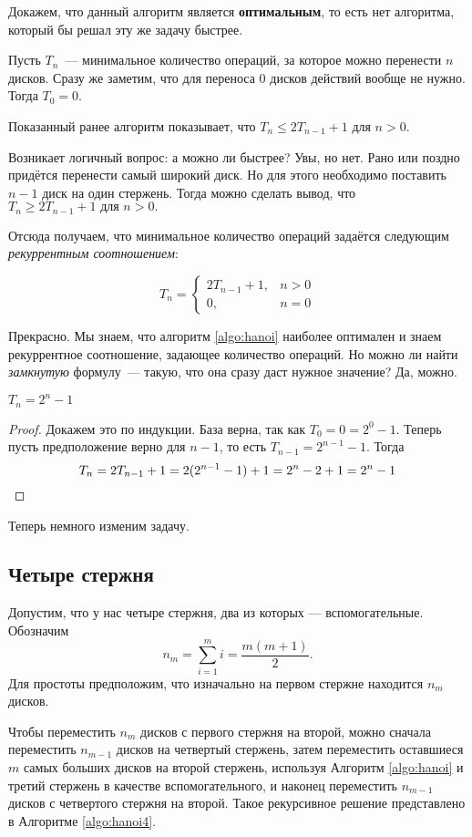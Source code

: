 \documentclass[a4paper,12pt]{article}
\begin{document}
Докажем, что данный алгоритм является \textbf{оптимальным}, то есть нет 
алгоритма, который бы решал эту же задачу быстрее.

Пусть $T_n$~--- минимальное количество операций, за которое можно перенести 
$n$ дисков. Сразу же заметим, что для переноса 0 дисков действий вообще не 
нужно. Тогда $T_0 = 0$.

Показанный ранее алгоритм показывает, что 
$T_n \leqslant 2T_{n - 1} + 1\text{ для } n > 0.$

Возникает логичный вопрос: а можно ли быстрее? Увы, но нет. Рано или поздно 
придётся перенести самый широкий диск. Но для этого необходимо поставить 
$n - 1$ диск на один стержень. Тогда можно сделать вывод, что $T_n \geqslant 
2T_{n - 1} + 1\text{ для } n > 0.$

Отсюда получаем, что минимальное количество операций задаётся следующим 
\emph{рекуррентным соотношением}:

\[T_n = \begin{cases}
2T_{n - 1} + 1, & n > 0 \\
0, & n = 0
\end{cases}\]

Прекрасно. Мы знаем, что алгоритм \ref{algo:hanoi} наиболее оптимален и знаем 
рекуррентное соотношение, задающее количество операций. Но можно ли найти 
\emph{замкнутую} формулу~--- такую, что она сразу даст нужное значение? Да, 
можно.

\begin{theorem}
	$T_n = 2^{n} - 1$
\end{theorem}
\begin{proof}
	Докажем это по индукции. База верна, так как $T_0 = 0 = 2^{0} - 1$. Теперь 
	пусть предположение верно для $n - 1$, то есть $T_{n - 1} = 2^{n - 1} - 1$.
	 Тогда \[T_{n} = 2T_{n - 1} + 1 = 2(2^{n - 1} - 1) + 1 = 2^n - 2 + 1 = 2^n - 1\qedhere\]
\end{proof}

Теперь немного изменим задачу.
\subsection{Четыре стержня}

Допустим, что у нас четыре стержня, два из которых --- вспомогательные. Обозначим
\[n_m = \sum_{i=1}^mi = \frac{m(m+1)}{2}.\]
Для простоты предположим, что изначально на первом стержне находится $n_m$ дисков.

Чтобы переместить $n_m$ дисков с первого стержня на второй, можно сначала 
переместить $n_{m-1}$ дисков на четвертый стержень, затем переместить оставшиеся
 $m$ самых больших дисков на второй стержень, используя Алгоритм \ref{algo:hanoi}
  и третий стержень в качестве вспомогательного, и наконец переместить $n_{m-1}$
   дисков с четвертого стержня на второй. Такое рекурсивное решение представлено
    в Алгоритме \ref{algo:hanoi4}.
\end{document}
